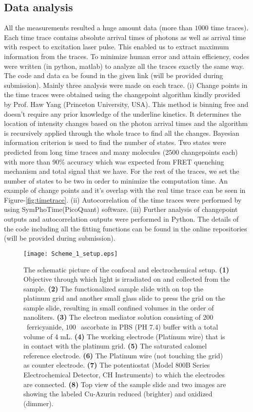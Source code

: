 \subsection{Data analysis}
All the measurements resulted a huge amount data (more than $1000$ time traces). Each time trace contains absolute arrival times of photons as well as arrival time with respect to excitation laser pulse. This enabled us to extract maximum information from the traces. To minimize human error and attain efficiency, codes were written (in python, matlab) to analyze all the traces exactly the same way. The code and data ca be found in the given link (will be provided during submission). Mainly three analysis were made on each trace. (i) Change points in the time traces were obtained using the changepoint algorithm\cite{watkins2005detection} kindly provided by Prof. Haw Yang (Princeton University, USA). This method is binning free and doesn't require any prior knowledge of the underline kinetics. It determines the location of intensity changes based on the photon arrival times and the algorithm is recursively applied through the whole trace to find all the changes. Bayesian information criterion is used to find the number of states. Two states were predicted from long time traces and many molecules (2500 changepoints each) with more than 90\% accuracy which was expected from FRET quenching mechanism and total signal that we have. For the rest of the traces, we set the number of states to be two in order to minimize the computation time. An example of change points and it's overlap with the real time trace can be seen in Figure-\ref{fig:timetrace}. (ii) Autocorrelation of the time traces were performed by using SymPhoTime(PicoQuant) software. (iii) Further analysis of changepoint outputs and autocorrelation outputs were performed in Python. The details of the code including all the fitting functions can be found in the online repositories (will be provided during submission).
\begin{figure}
	\centering
	\texttt{[image: Scheme\_1\_setup.eps]}
	\caption{The schematic picture of the confocal and electrochemical setup. \textbf{(1)} Objective through which light is irradiated on and collected from the sample. \textbf{(2)} The functionalized sample slide with on top the platinum grid and another small glass slide to press the grid on the sample slide, resulting in small confined volumes in the order of nanoliters. \textbf{(3)} The electron mediator solution consisting of $200~$\uM~ferricyanide, $100~$\uM~ascorbate in PBS (PH 7.4) buffer with a total volume of 4 mL. \textbf{(4)} The working electrode (Platinum wire) that is in contact with the platinum grid. \textbf{(5)} The saturated calomel reference electrode. \textbf{(6)} The Platinum wire (not touching the grid) as counter electrode. \textbf{(7)} The potentiostat (Model 800B Series Electrochemical Detector, CH Instruments) to which the electrodes are connected. \textbf{(8)} Top view of the sample slide and two images are showing the labeled Cu-Azurin reduced (brighter) and oxidized (dimmer).}
  	\label{sch:setup}
\end{figure}
